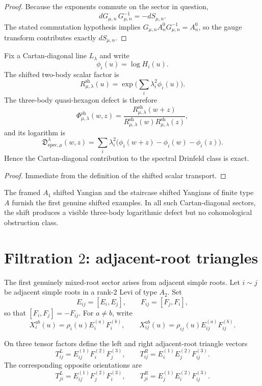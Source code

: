 \begin{proof}
Because the exponents commute on the sector in question,
\[
dG_{\mu,n}\,G_{\mu,n}^{-1}=-dS_{\mu,n}.
\]
The stated commutation hypothesis implies
$G_{\mu,n}A_n^0G_{\mu,n}^{-1}=A_n^0$, so the gauge transform contributes
exactly $dS_{\mu,n}$.
\end{proof}

\begin{theorem}
\ClaimStatusProvedHere
\label{thm:cartan-diagonal-defect-exact}
Fix a Cartan-diagonal line $L_\lambda$ and write
\[
\phi_i(u)=\log H_i(u).
\]
The shifted two-body scalar factor is
\[
R_{\mu,\lambda}^{\mathrm{sh}}(u)=
\exp\!\Big(\sum_i \lambda_i^2\phi_i(u)\Big).
\]
The three-body quasi-hexagon defect is therefore
\[
\Phi_{\mu,\lambda}^{\mathrm{sh}}(w,z)=
\frac{R_{\mu,\lambda}^{\mathrm{sh}}(w+z)}{R_{\mu,\lambda}^{\mathrm{sh}}(w)
R_{\mu,\lambda}^{\mathrm{sh}}(z)},
\]
and its logarithm is
\[
\mathfrak D_{\mathrm{spec},\mu}^{\lambda}(w,z)=
\sum_i \lambda_i^2\big(\phi_i(w+z)-\phi_i(w)-\phi_i(z)\big).
\]
Hence the Cartan-diagonal contribution to the spectral Drinfeld class is
exact.
\end{theorem}

\begin{proof}
Immediate from the definition of the shifted scalar transport.
\end{proof}

\begin{remark}
The framed $A_1$ shifted Yangian and the staircase shifted Yangians of
finite type~$A$ furnish the first genuine shifted examples. In all such
Cartan-diagonal sectors, the shift produces a visible three-body
logarithmic defect but no cohomological obstruction class.
\end{remark}

\section{Filtration $2$: adjacent-root triangles}

The first genuinely mixed-root sector arises from adjacent simple roots.
Let $i\sim j$ be adjacent simple roots in a rank-$2$ Levi of type $A_2$.
Set
\[
E_{ij}=[E_i,E_j],
\qquad
F_{ij}=[F_j,F_i],
\]
so that $[F_i,F_j]=-F_{ij}$.
For $a\neq b$, write
\[
X_i^{ab}(u)=\rho_i(u)E_i^{(a)}F_i^{(b)},
\qquad
X_{ij}^{ab}(u)=\rho_{ij}(u)E_{ij}^{(a)}F_{ij}^{(b)}.
\]

\begin{definition}
On three tensor factors define the left and right adjacent-root triangle
vectors
\[
T_{ij}^{L}=E_{ij}^{(1)}F_i^{(2)}F_j^{(3)},
\qquad
T_{ij}^{R}=E_i^{(1)}E_j^{(2)}F_{ij}^{(3)}.
\]
The corresponding opposite orientations are
\[
T_{ji}^{L}=E_{ij}^{(1)}F_j^{(2)}F_i^{(3)},
\qquad
T_{ji}^{R}=E_j^{(1)}E_i^{(2)}F_{ij}^{(3)}.
\]
\end{definition}

